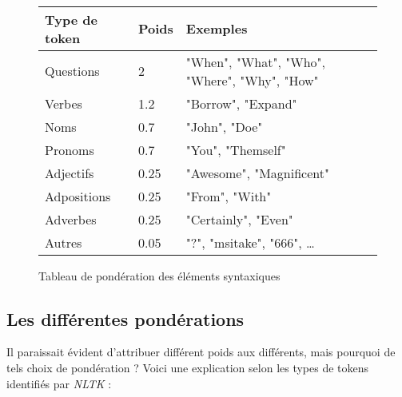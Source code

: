 \ 
\newline
\begin{figure}[h]
\begin{center}
\begin{tabular}{lll}
Type de token & Poids & Exemples \\
\hline
Questions & 2 & "When", "What", "Who", "Where", "Why", "How"\\
Verbes & 1.2 & "Borrow", "Expand" \\
Noms & 0.7 & "John", "Doe" \\
Pronoms & 0.7 & "You", "Themself" \\
Adjectifs & 0.25 & "Awesome", "Magnificent" \\ 
Adpositions & 0.25 & "From", "With" \\
Adverbes & 0.25 & "Certainly", "Even" \\
Autres & 0.05 & "?", "msitake", "666", \dots \\
\end{tabular}
\caption{Tableau de pondération des éléments syntaxiques}
\label{ponderationTab}
\end{center}
\end{figure}

\subsection{Les différentes pondérations}

Il paraissait évident d'attribuer différent poids aux différents, mais pourquoi de tels choix de pondération ? Voici une explication selon les types de tokens identifiés par \textit{NLTK} : \newline

